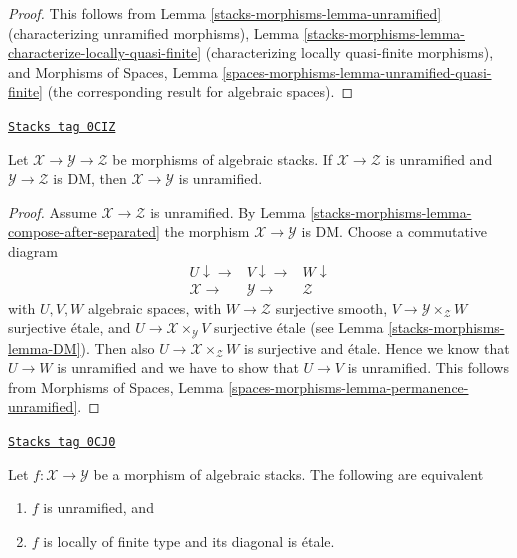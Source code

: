 \begin{proof}
This follows from
Lemma \ref{stacks-morphisms-lemma-unramified} (characterizing unramified morphisms),
Lemma \ref{stacks-morphisms-lemma-characterize-locally-quasi-finite} (characterizing
locally quasi-finite morphisms), and
Morphisms of Spaces, Lemma
\ref{spaces-morphisms-lemma-unramified-quasi-finite} (the corresponding
result for algebraic spaces).
\end{proof}

\begin{lemma}
\label{stacks-morphisms-lemma-permanence-unramified}
\href{https://stacks.math.columbia.edu/tag/0CIZ}{\texttt{Stacks tag 0CIZ}}

Let $\mathcal{X} \to \mathcal{Y} \to \mathcal{Z}$ be
morphisms of algebraic stacks.
If $\mathcal{X} \to \mathcal{Z}$ is unramified and
$\mathcal{Y} \to \mathcal{Z}$ is DM, then
$\mathcal{X} \to \mathcal{Y}$ is unramified.
\end{lemma}

\begin{proof}
Assume $\mathcal{X} \to \mathcal{Z}$ is unramified. By
Lemma \ref{stacks-morphisms-lemma-compose-after-separated} the morphism
$\mathcal{X} \to \mathcal{Y}$ is DM. Choose a commutative diagram
$$
\begin{array}{ccc}U \downarrow\longrightarrow & V \downarrow\longrightarrow & W \downarrow \\ \mathcal{X} \longrightarrow & \mathcal{Y} \longrightarrow & \mathcal{Z}\end{array}
$$
with $U, V, W$ algebraic spaces,
with $W \to \mathcal{Z}$ surjective smooth,
$V \to \mathcal{Y} \times_\mathcal{Z} W$ surjective \'etale, and
$U \to \mathcal{X} \times_\mathcal{Y} V$ surjective \'etale
(see Lemma \ref{stacks-morphisms-lemma-DM}). Then also
$U \to \mathcal{X} \times_\mathcal{Z} W$ is surjective and \'etale.
Hence we know that $U \to W$ is unramified and we have to show that
$U \to V$ is unramified. This follows from
Morphisms of Spaces, Lemma \ref{spaces-morphisms-lemma-permanence-unramified}.
\end{proof}

\begin{lemma}
\label{stacks-morphisms-lemma-characterize-unramified}
\href{https://stacks.math.columbia.edu/tag/0CJ0}{\texttt{Stacks tag 0CJ0}}

Let $f : \mathcal{X} \to \mathcal{Y}$ be a morphism of algebraic stacks.
The following are equivalent
\begin{enumerate}
\item $f$ is unramified, and
\item $f$ is locally of finite type and its diagonal is \'etale.
\end{enumerate}
\end{lemma}

